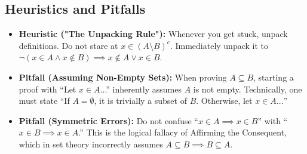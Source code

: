 \documentclass[11pt]{article}
\begin{document}
\begin{center}
\end{center}

\subsection{Heuristics and Pitfalls}
\begin{itemize}
    \item \textbf{Heuristic ("The Unpacking Rule"):} Whenever you get stuck, unpack definitions. Do not stare at $x \in (A \setminus B)^c$. Immediately unpack it to $\neg(x \in A \land x \notin B) \implies x \notin A \lor x \in B$.
    \item \textbf{Pitfall (Assuming Non-Empty Sets):} When proving $A \subseteq B$, starting a proof with ``Let $x \in A$...'' inherently assumes $A$ is not empty. Technically, one must state ``If $A = \emptyset$, it is trivially a subset of $B$. Otherwise, let $x \in A\dots$''
    \item \textbf{Pitfall (Symmetric Errors):} Do not confuse ``$x \in A \implies x \in B$'' with ``$x \in B \implies x \in A$.'' This is the logical fallacy of Affirming the Consequent, which in set theory incorrectly assumes $A \subseteq B \implies B \subseteq A$.
\end{itemize}
\end{document}

